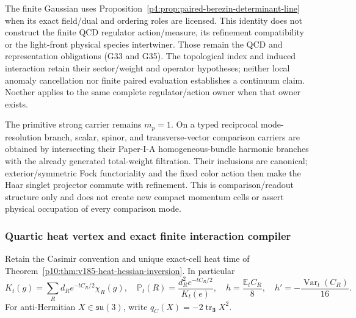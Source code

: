 \documentclass[12pt,a4paper]{article}
\begin{document}
\begin{remark}
\label{p10:rem:m8-batch-qcd-inputs}
The finite Gaussian uses
Proposition~\ref{p4:prop:paired-berezin-determinant-line}
when its exact field/dual and ordering roles are licensed.
This identity does not construct the finite QCD regulator
action/measure, its refinement compatibility or the
light-front physical species intertwiner.  Those remain
the QCD and representation obligations (G33 and G35).
The topological index and induced interaction retain
their sector/weight and operator hypotheses; neither
local anomaly cancellation nor finite paired evaluation
establishes a continuum claim.  Noether applies to the
same complete regulator/action owner when that owner exists.
\end{remark}



\begin{remark}
\label{p10:rem:typed-mode-refinement}
The primitive strong carrier remains $m_p=1$.  On a typed reciprocal
mode-resolution branch, scalar, spinor, and transverse-vector comparison
carriers are obtained by intersecting their Paper-I-A homogeneous-bundle
harmonic branches with the already generated total-weight filtration.  Their
inclusions are canonical; exterior/symmetric Fock functoriality and the fixed
color action then make the Haar singlet projector commute with refinement.
This is comparison/readout structure only and does not create new compact
momentum cells or assert physical occupation of every comparison mode.
\end{remark}



\subsubsection{Quartic heat vertex and exact finite interaction compiler}
\label{p10:sec:v199-heat-interactions}
Retain the Casimir convention and unique exact-cell heat time of
Theorem~\ref{p10:thm:v185-heat-hessian-inversion}.  In particular
\[
 K_t(g)=\sum_Rd_Re^{-tC_R/2}\chi_R(g),\quad
 \mathbb P_t(R)=\frac{d_R^2e^{-tC_R/2}}{K_t(e)},\quad
 h=\frac{\mathbb E_tC_R}{8},\quad h'=-\frac{\operatorname{Var}_t(C_R)}{16}.
\]
For anti-Hermitian \(X\in\mathfrak{su}(3)\), write
\(q_C(X)=-2\operatorname{tr}_{\mathbf3}X^2\).
\end{document}
